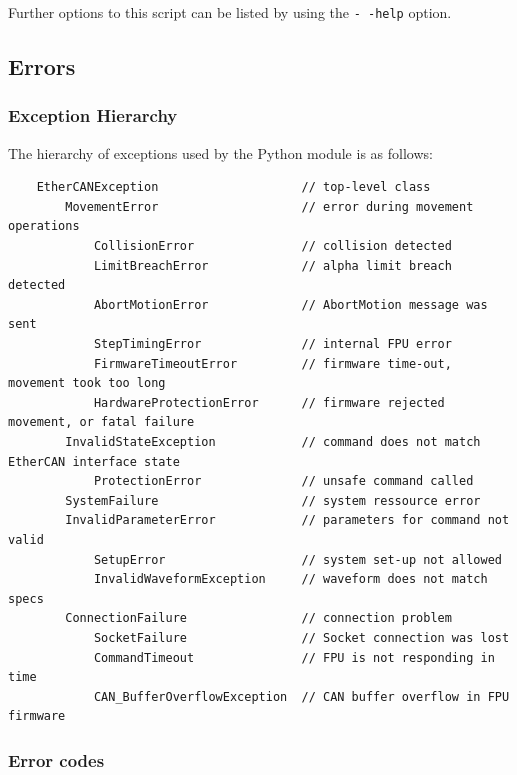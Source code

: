 \documentclass[11pt,a4paper]{scrartcl}
\begin{document}
Further options to this script can be listed by using the
\texttt{-\,-help} option.


\subsection{Errors}
\label{sec:errors}

\subsubsection{Exception Hierarchy}
\label{sec:ExceptionsReference}
The hierarchy of exceptions used by the Python module is as follows:

\begin{verbatim}
    EtherCANException                    // top-level class
        MovementError                    // error during movement operations
            CollisionError               // collision detected
            LimitBreachError             // alpha limit breach detected
            AbortMotionError             // AbortMotion message was sent
            StepTimingError              // internal FPU error
            FirmwareTimeoutError         // firmware time-out, movement took too long
            HardwareProtectionError      // firmware rejected movement, or fatal failure
        InvalidStateException            // command does not match EtherCAN interface state
            ProtectionError              // unsafe command called
        SystemFailure                    // system ressource error
        InvalidParameterError            // parameters for command not valid
            SetupError                   // system set-up not allowed
            InvalidWaveformException     // waveform does not match specs
        ConnectionFailure                // connection problem
            SocketFailure                // Socket connection was lost
            CommandTimeout               // FPU is not responding in time
            CAN_BufferOverflowException  // CAN buffer overflow in FPU firmware

\end{verbatim}

\subsubsection{Error codes}
\label{sec:errorcodes}
\end{document}
